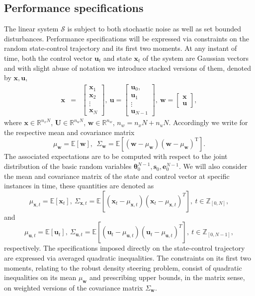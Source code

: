 \documentclass[letterpaper,11pt]{article}
\newcommand{\AR}[2]{\left[\begin{array}{#1}#2\end{array}\right]}
\newcommand{\T}{\mathrm{T}}
\begin{document}
\subsection{Performance specifications}

The linear system $\mathcal{S}$ is subject to both stochastic noise as well 
as set bounded disturbances. Performance specifications will be expressed via constraints on the random state-control trajectory and its first two moments. 
At any instant of time, 
both the control vector $\mathbf{u}_t$ and state $\mathbf{\mathbf{x}}_t$ of the system are Gaussian vectors and with slight abuse of notation we introduce stacked versions of them, denoted by  $\mathbf{x}, \mathbf{u}$,
\begin{eqnarray}
\label{state-control-trajectory}
\mathbf{x} &= & \AR{c}{  \mathbf{x}_1 \\ \mathbf{x}_2 \\  \vdots \\ \mathbf{x}_{N}},~
\mathbf{u} =  \AR{c}{  \mathbf{u}_0, \\  \mathbf{u}_1 \\ \vdots \\ \mathbf{u}_{N-1}},~
\mathbf{w} = \AR{c}{\mathbf{x} \\  \mathbf{u} },
\end{eqnarray}
where $\mathbf{x} \in \mathbb{R}^{n_x N}$,  $\mathbf{U} \in \mathbb{R}^{n_u N}$, $\mathbf{w} \in \mathbb{R}^{n_w}$, $n_w = n_x  N +  n_u  N$. 
Accordingly we write for the respective mean and covariance matrix
$$
\mu_{\mathbf{w}} = \mathbb{E}[\mathbf{w}],~~\Sigma_{\mathbf{w}} = \mathbb{E}[(\mathbf{w} - \mu_{\mathbf{w}}) (\mathbf{w}- \mu_{\mathbf{w}})^{\T} ].
$$
The associated expectations are to be computed with respect to 
the joint distribution of the basic random variables  $ \bm{\theta}_0^{N-1}, \mathbf{s}_0,  
\mathbf{e}_0^{N-1}$.  We will also consider the mean and covariance matrix
of the state and control vector at specific instances in time, these
quantities are denoted as
$$
\mu_{\mathbf{x},t} = \mathbb{E}[\mathbf{x}_t],~
\Sigma_{\mathbf{x},t} = \mathbb{E}[(\mathbf{x}_t- \mu_{\mathbf{x},t}) (\mathbf{x}_t- \mu_{\mathbf{x},t})^{T}],~ 
t \in \mathbb{Z}_{[0,N]},
$$
and 
$$
\mu_{\mathbf{u},t} = \mathbb{E}[\mathbf{u}_t],~
\Sigma_{\mathbf{u},t} = \mathbb{E}[(\mathbf{u}_t- \mu_{\mathbf{u},t}) (\mathbf{u}_t- \mu_{\mathbf{u},t})^{T}],
~
t \in \mathbb{Z}_{[0,N-1]},
$$
respectively. The specifications imposed directly on the state-control trajectory are expressed via averaged quadratic inequalities. 
The constraints on its first two moments, relating to the robust density steering problem, consist of quadratic inequalities on its mean $\mu_\mathbf{w} $ and prescribing upper bounds, in the matrix sense, 
on weighted versions of the covariance matrix $ \Sigma_{\mathbf{w}}$.
\end{document}
